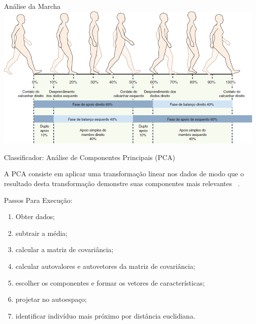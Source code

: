 \documentclass{beamer}
\begin{document}
\begin{frame}{Análise da Marcha~\cite{neumann2012cinesiologia}}
      \center \includegraphics[height=2.2 in]{img/analisemarcha.png}
\end{frame}







\begin{frame}{Classificador: Análise de Componentes Principais (PCA)}
\begin{block}{}
			A PCA consiste em aplicar uma transformação linear nos dados de modo que o resultado desta transformação demonstre suas componentes mais relevantes ~\cite{smith2002}.
\end{block}

\begin{block}{Passos Para Execução:}
	\begin{enumerate}[<+->]
		\item Obter dados;
		\item subtrair a média;
		\item calcular a matriz de covariância;
		\item calcular autovalores e autovetores da matriz de covariância;
		\item escolher os componentes e formar os vetores de características;
		\item projetar no autoespaço;
		\item identificar indivíduo mais próximo por distância euclidiana.
	\end{enumerate}			
\end{block}
\end{frame}
\end{document}
